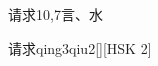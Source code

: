 \begin{entry}{请求}{10,7}{⾔、⽔}
  \begin{phonetics}{请求}{qing3qiu2}[][HSK 2]
  \end{phonetics}
\end{entry}
